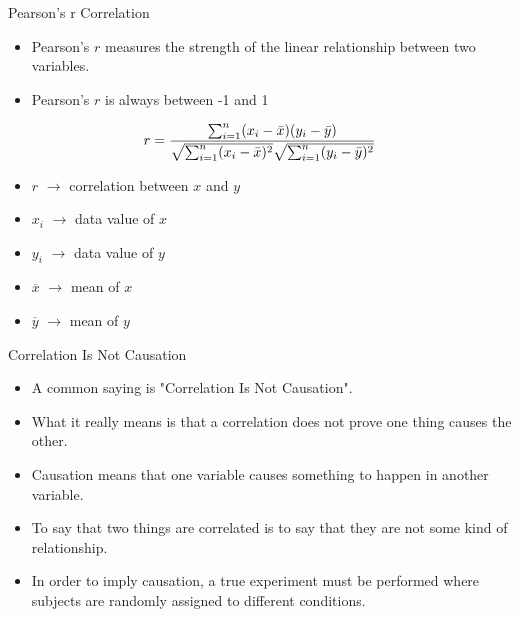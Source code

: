 \begin{frame}[t]{Pearson's r Correlation}
	\begin{itemize}
		\item  Pearson's $r$ measures the strength of the linear relationship 
		between two variables.
		\item Pearson's $r$ is always between -1 and 1 
	\end{itemize}
	
	\begin{equation*}
	r =
	\frac{ \sum_{i=1}^{n}(x_i-\bar{x})(y_i-\bar{y}) }{%
		\sqrt{\sum_{i=1}^{n}(x_i-\bar{x})^2}\sqrt{\sum_{i=1}^{n}(y_i-\bar{y})^2}}
	\end{equation*}



	\begin{itemize}
		\item $r$ $\rightarrow$ correlation between $x$ and $y$
		\item $x_i$ $ \rightarrow$ data value of $x$
		\item $y_i$ $\rightarrow$ data value of $y$
		\item $\overline{x}$ $\rightarrow$  mean of $x$
		\item $\overline{y}$ $\rightarrow$ mean of $y$
	\end{itemize}
\end{frame}

\begin{frame}[t]{Correlation Is Not Causation}
	\begin{itemize}
		\item A common saying is "Correlation Is Not Causation".
		\item What it really means is that a correlation does not prove one 
		thing causes the other.
		\item Causation means that one variable causes something to happen in 
		another variable.
		\item To say that two things are correlated is to say that they are not 
		some kind of relationship.
		\item In order to imply causation, a true experiment must be performed 
		where subjects are randomly assigned to different conditions.
	\end{itemize}
\end{frame}
